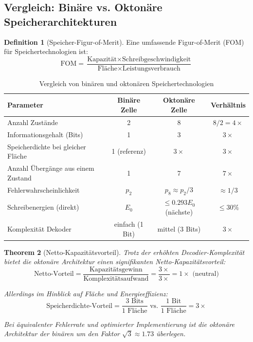 \documentclass[12pt, a4paper]{article}
\newtheorem{theorem}{Theorem}[section]
\theoremstyle{definition}
\newtheorem{definition}[theorem]{Definition}
\theoremstyle{remark}
\begin{document}
\subsection{Vergleich: Binäre vs. Oktonäre Speicherarchitekturen}
\label{subsec:vergleich_binaer_oktonaer}

\begin{definition}[Speicher-Figur-of-Merit]
\label{def:figur_of_merit}
Eine umfassende Figur-of-Merit (FOM) für Speichertechnologien ist:
\[
\mathrm{FOM} = \frac{\text{Kapazität} \times \text{Schreibgeschwindigkeit}}{\text{Fläche} \times \text{Leistungsverbrauch}}
\]
\end{definition}

\begin{table}[H]
\centering \small
\caption{Vergleich von binären und oktonären Speichertechnologien}
\label{tab:binaer_vs_oktonaer}
\begin{tabular}{|l|c|c|c|}
\hline 
\textbf{Parameter} & \textbf{Binäre Zelle} & \textbf{Oktonäre Zelle} & \textbf{Verhältnis} \\
\hline
Anzahl Zustände & 2 & 8 & $8/2 = 4\times$ \\
Informationsgehalt (Bits) & 1 & 3 & $3\times$ \\
Speicherdichte bei gleicher Fläche & 1 (referenz) & $3\times$ & $3\times$ \\
Anzahl Übergänge aus einem Zustand & 1 & 7 & $7\times$ \\
Fehlerwahrscheinlichkeit & $p_2$ & $p_8 \approx p_2/3$ & $\approx 1/3$ \\
Schreibenergien (direkt) & $E_0$ & $\leq 0.293 E_0$ (nächste) & $\leq 30\%$ \\
Komplexität Dekoder & einfach (1 Bit) & mittel (3 Bits) & $3\times$ \\
\hline
\end{tabular}
\end{table}

\begin{theorem}[Netto-Kapazitätsvorteil]
\label{thm:netto_kapazitätsvorteil}
Trotz der erhöhten Decodier-Komplexität bietet die oktonäre Architektur einen signifikanten Netto-Kapazitätsvorteil:
\[
\text{Netto-Vorteil} = \frac{\text{Kapazitätsgewinn}}{\text{Komplexitätsaufwand}} = \frac{3\times}{3\times} = 1\times \text{ (neutral)}
\]

Allerdings im Hinblick auf Fläche und Energieeffizienz:
\[
\text{Speicherdichte-Vorteil} = \frac{3 \text{ Bits}}{1 \text{ Fläche}} \text{ vs. } \frac{1 \text{ Bit}}{1 \text{ Fläche}} = 3\times
\]

Bei äquivalenter Fehlerrate und optimierter Implementierung ist die oktonäre Architektur der binären um den Faktor $\sqrt{3} \approx 1.73$ überlegen.
\end{theorem}
\end{document}

